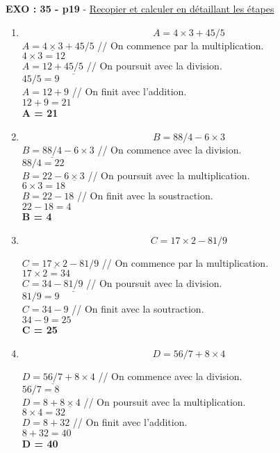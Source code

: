 \documentclass[11pt]{article}
\begin{document}
\textbf{EXO : 35 - p19} - \underline{Recopier et calculer en détaillant les étapes}
\begin{enumerate}

\item $$A = 4 \times 3 + 45 / 5$$
  $A =  \underline{4 \times 3} + 45 / 5$ // On commence par la multiplication.\\
  $4 \times 3 = 12$\\
  $A =  12 + \underline{45 / 5}$ // On poursuit avec la division.\\
  $45 / 5 = 9$\\
  $A = 12 + 9$ // On finit avec l'addition.\\
  $12 + 9 = 21$\\ 
  \textbf{A = 21}\\
  
\item $$B = 88/4 - 6 \times 3$$
  $B = \underline{88/4} - 6 \times 3$ // On commence avec la division.\\
  $88/4 = 22$\\
  $B = 22 - \underline{6 \times 3}$ // On poursuit avec la multiplication.\\
  $6 \times 3 = 18$\\
  $B = 22 - 18$  // On finit avec la soustraction.\\
  $22 - 18 = 4$\\
  \textbf{B = 4}\\
  
\item $$C = 17 \times 2 - 81/9$$

  $C =  \underline{17 \times 2} - 81/9$ // On commence par la multiplication.\\
  $17 \times 2 = 34$\\
  $C =  34 - \underline{81/9}$ // On poursuit avec la division.\\
  $81/9 = 9$\\
  $C =  34 - 9$ // On finit avec la soutraction.\\
  $34 - 9 = 25$\\
  \textbf{C = 25}\\

\item $$D = 56/7 + 8 \times 4$$

  $D = \underline{56/7} + 8 \times 4$ // On commence avec la division.\\
  $56/7 = 8$\\
  $D = 8 + \underline{8 \times 4}$ // On poursuit avec la multiplication.\\
  $8 \times 4 = 32$\\
  $D = 8 + 32$ // On finit avec l'addition.\\
  $8 + 32 = 40$\\
  \textbf{D = 40}\\
\end{enumerate}
\end{document}
